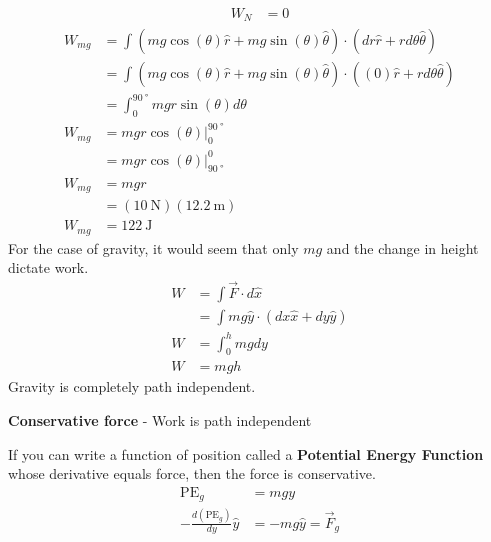 \documentclass{article}
\begin{document}
\begin{align*}
	W_N & = 0
\end{align*}
\begin{align*}
	W_{mg} & = \int \left( mg\cos(\theta) \hat{r} + mg\sin(\theta) \hat{\theta} \right) \cdot \left( dr \hat{r} + rd\theta \hat{\theta} \right) \\
		   & = \int \left( mg\cos(\theta) \hat{r} + mg\sin(\theta) \hat{\theta} \right) \cdot \left( (0) \hat{r} + rd\theta \hat{\theta} \right) \\
		   & = \int_0^{\SI{90}{\degree}} mgr\sin(\theta) d\theta \\
	W_{mg} & = mgr\cos(\theta) \biggr\rvert_0^{\SI{90}{\degree}} \\
		   & = mgr\cos(\theta) \biggr\rvert_{\SI{90}{\degree}}^0 \\
	W_{mg} & = mgr \\
		   & = (\SI{10}{\newton})(\SI{12.2}{\meter}) \\
	W_{mg} & = \SI{122}{\joule}
\end{align*}
For the case of gravity, it would seem that only $ mg $ and the change in height dictate work.
\begin{align*}
	W & = \int \vec{F} \cdot d\hat{x} \\
	  & = \int mg \hat{y} \cdot (dx \hat{x} + dy \hat{y}) \\
	W & = \int_0^h mg dy \\
	W & = mgh
\end{align*}
Gravity is completely path independent.

\textbf{Conservative force} - Work is path independent

If you can write a function of position called a \textbf{Potential Energy Function} whose derivative equals force, then the force is conservative.
\begin{align*}
	\text{PE}_g & = mgy \\
	-\frac{d \left( \text{PE}_g \right)}{dy} \hat{y} & = -mg \hat{y} = \vec{F}_g \\
\end{align*}
\end{document}
